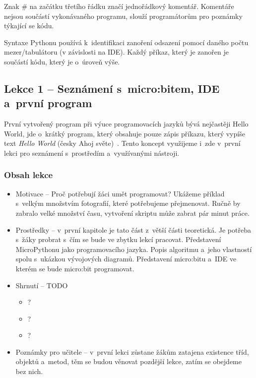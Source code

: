 \documentclass[
  digital,     %
  oneside,     %
  nosansbold,  %
  colorbold, %
  lof,         %
  nolot,         %
]{fithesis4}
\begin{document}
Znak \# na začátku třetího řádku značí jednořádkový komentář. Komentáře nejsou součástí vykonávaného programu, slouží programátorům pro poznámky týkající se kódu.

Syntaxe Pythonu používá k~identifikaci zanoření odsazení pomocí daného počtu mezer/tabulátoru (v závislosti na IDE). Každý příkaz, který je zanořen je součástí kódu, který je o~úroveň výše.

\subsection{Lekce 1 -- Seznámení s~micro:bitem, IDE a~první program}
První vytvořený program při výuce programovacích jazyků bývá nejčastěji Hello World, jde o~krátký program, který obsahuje pouze zápis příkazu, který vypíše text \textit{Hello World} (česky Ahoj světe)~\cite{helloWorld}. Tento koncept využijeme i~zde v~první lekci pro seznámení s~prostředím a~využívanými nástroji.
\subsubsection{Obsah lekce}
\begin{itemize}
    \item Motivace -- Proč potřebují žáci umět programovat? Ukážeme příklad s~velkým množstvím fotografií, které potřebujeme přejmenovat. Ručně by zabralo velké množství času, vytvoření skriptu může zabrat pár minut práce.
    \item Prostředky -- v~první kapitole je tato část z~větší části teoretická. Je potřeba s~žáky probrat s~čím se bude ve zbytku lekcí pracovat. Představení MicroPythonu jako programovacího jazyka. Popis algoritmu a~jeho vlastností spolu s~ukázkou vývojových diagramů. Představení micro:bitu a~IDE ve kterém se bude micro:bit programovat. 
    \item Shrnutí -- TODO
    \begin{itemize}
        \item ?
        \item ?
        \item ?
    \end{itemize}
    \item Poznámky pro učitele -- v~první lekci zůstane žákům zatajena existence tříd, objektů a~metod, těm se budou věnovat pozdější lekce, zatím se obejdeme bez nich.
\end{itemize}
\end{document}
